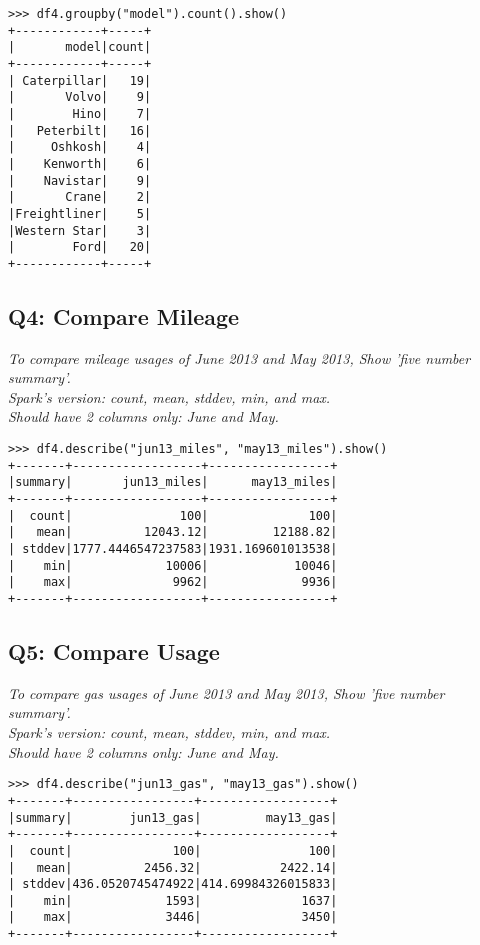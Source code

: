 \documentclass[]{article}
\begin{document}
\begin{verbatim}
>>> df4.groupby("model").count().show()
+------------+-----+
|       model|count|
+------------+-----+
| Caterpillar|   19|
|       Volvo|    9|
|        Hino|    7|
|   Peterbilt|   16|
|     Oshkosh|    4|
|    Kenworth|    6|
|    Navistar|    9|
|       Crane|    2|
|Freightliner|    5|
|Western Star|    3|
|        Ford|   20|
+------------+-----+	
\end{verbatim}

\subsection*{Q4: Compare Mileage}
\emph{To compare mileage usages of June 2013 and May 2013, 
	Show 'five number summary'. \\
	Spark’s version: count, mean, stddev, min, and max. \\
	Should have 2 columns only: June and May.} \\

\begin{verbatim}
>>> df4.describe("jun13_miles", "may13_miles").show()
+-------+------------------+-----------------+
|summary|       jun13_miles|      may13_miles|
+-------+------------------+-----------------+
|  count|               100|              100|
|   mean|          12043.12|         12188.82|
| stddev|1777.4446547237583|1931.169601013538|
|    min|             10006|            10046|
|    max|              9962|             9936|
+-------+------------------+-----------------+	
\end{verbatim}

\clearpage

\subsection*{Q5: Compare Usage}
\emph{To compare gas usages of June 2013 and May 2013, 
	Show 'five number summary'. \\ 
	Spark’s version: count, mean, stddev, min, and max. \\ 
	Should have 2 columns only: June and May.} \\

\begin{verbatim}
>>> df4.describe("jun13_gas", "may13_gas").show()
+-------+-----------------+------------------+
|summary|        jun13_gas|         may13_gas|
+-------+-----------------+------------------+
|  count|              100|               100|
|   mean|          2456.32|           2422.14|
| stddev|436.0520745474922|414.69984326015833|
|    min|             1593|              1637|
|    max|             3446|              3450|
+-------+-----------------+------------------+	
\end{verbatim}
\end{document}
